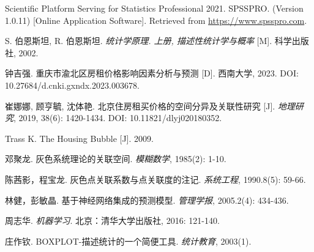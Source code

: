 \documentclass[12pt]{article}
\begin{document}
\begin{CJK}{UTF8}{gbsn}
	\begin{thebibliography}{99}
		
		 Scientific Platform Serving for Statistics Professional 2021. SPSSPRO. (Version 1.0.11) [Online Application Software]. Retrieved from \url{https://www.spsspro.com}.
		
		 S. 伯恩斯坦, R. 伯恩斯坦. \textit{统计学原理. 上册, 描述性统计学与概率} [M]. 科学出版社, 2002.
		
		 钟吉强. 重庆市渝北区房租价格影响因素分析与预测 [D]. 西南大学, 2023. DOI: 10.27684/d.cnki.gxndx.2023.003678.
		
		 崔娜娜, 顾亨毓, 沈体艳. 北京住房租买价格的空间分异及关联性研究 [J]. \textit{地理研究}, 2019, 38(6): 1420-1434. DOI: 10.11821/dlyj020180352.
		
		 Trass K. The Housing Bubble [J]. 2009.
		
		 邓聚龙. 灰色系统理论的关联空间. \textit{模糊数学}, 1985(2): 1-10.
		
		 陈茜影，程宝龙. 灰色点关联系数与点关联度的注记. \textit{系统工程}, 1990.8(5): 59-66.
		
		 林健，彭敏晶. 基于神经网络集成的预测模型. \textit{管理学报}, 2005.2(4): 434-436.
		
		 周志华. \textit{机器学习}. 北京：清华大学出版社, 2016: 121-140.
		
		 庄作钦. BOXPLOT-描述统计的一个简便工具. \textit{统计教育}, 2003(1).
		
	\end{thebibliography}
	
	
	
	
\end{CJK}
\end{document}
